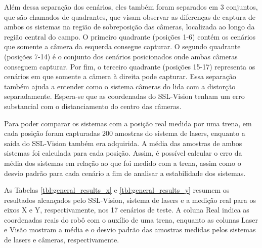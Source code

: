 \documentclass[acronym, symbols, table, deposito]{fei}
\begin{document}
				Além dessa separação dos cenários, eles também foram separados em 3 conjuntos, que são chamados de quadrantes, que visam observar as diferenças de captura de ambos os sistemas na região de sobreposição das câmeras, localizada ao longo da região central do campo. O primeiro quadrante (posições 1-6) contém os cenários que somente a câmera da esquerda consegue capturar. O segundo quadrante (posições 7-14) é o conjunto dos cenários posicionados onde ambas câmeras conseguem capturar. Por fim, o terceiro quadrante (posições 15-17) representa os cenários em que somente a câmera à direita pode capturar. Essa separação também ajuda a entender como o sistema câmeras do  lida com a distorção separadamente. Espera-se que as coordenadas do SSL-Vision tenham um erro substancial com o distanciamento do centro das câmeras.
				
				Para poder comparar os sistemas com a posição real medida por uma trena, em cada posição foram capturadas 200 amostras do sistema de lasers, enquanto a saída do SSL-Vision também era adquirida. A média das amostras de ambos sistemas foi calculada para cada posição. Assim, é possível calcular o erro da média dos sistemas em relação ao que foi medido com a trena, assim como o desvio padrão para cada cenário a fim de analisar a estabilidade dos sistemas.
				
				As Tabelas \ref{tbl:general_results_x} e \ref{tbl:general_results_y} resumem os resultados alcançados pelo SSL-Vision, sistema de lasers e a medição real para os eixos X e Y, respectivamente, nos 17 cenários de teste. A coluna Real indica as coordenadas reais do robô com o auxílio de uma trena, enquanto as colunas Laser e Visão mostram a média e o desvio padrão das amostras medidas pelos sistemas de lasers e câmeras, respectivamente.
				
\end{document}
